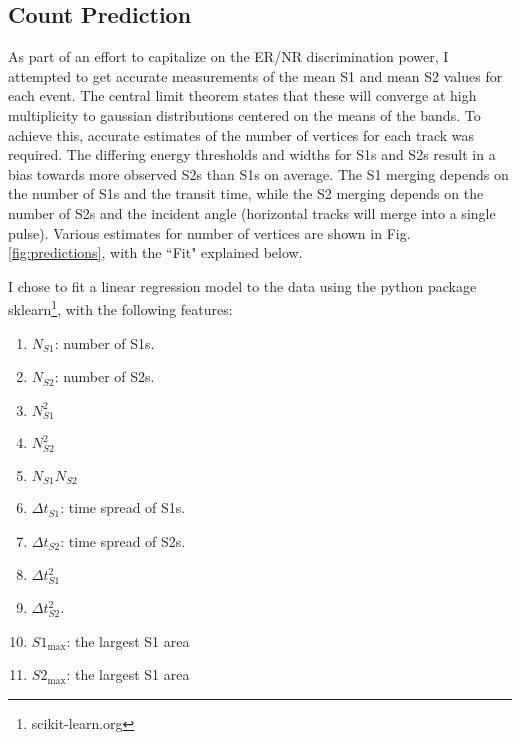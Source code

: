 \subsection{Count Prediction}
As part of an effort to capitalize on the ER/NR discrimination power, I attempted to get accurate measurements of the mean S1 and mean S2 values for each event.
The central limit theorem\cite{abramowitz_handbook_1972} states that these will converge at high multiplicity to gaussian distributions centered on the means of the bands.
To achieve this, accurate estimates of the number of vertices for each track was required.
The differing energy thresholds and widths for S1s and S2s result in a bias towards more observed S2s than S1s on average.
The S1 merging depends on the number of S1s and the transit time, while the S2 merging depends on the number of S2s and the incident angle (horizontal tracks will merge into a single pulse).
Various estimates for number of vertices are shown in Fig. \ref{fig:predictions}, with the ``Fit" explained below.

I chose to fit a linear regression model to the data using the python package sklearn\footnote{scikit-learn.org}, with the following features:
\begin{enumerate}
    \item $N_{S1}$: number of S1s.
    \item $N_{S2}$: number of S2s.
    \item $N_{S1}^2$
    \item $N_{S2}^2$
    \item $N_{S1}N_{S2}$
    \item $\Delta t_{S1}$: time spread of S1s.
    \item $\Delta t_{S2}$: time spread of S2s.
    \item $\Delta t_{S1}^2$
    \item $\Delta t_{S2}^2$.
    \item $S1_{\text{max}}$: the largest S1 area
    \item $S2_{\text{max}}$: the largest S1 area
\end{enumerate}

